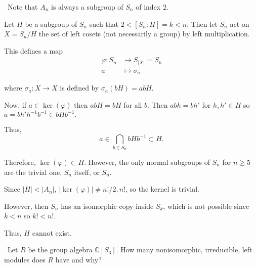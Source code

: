 \documentclass[12pt]{AlgebraQual}
\begin{document}
\begin{solution}$\,$
Note that $A_n$ is always a subgroup of $S_n$ of index $2.$

Let $H$ be a subgroup of $S_n$ such that $2<[S_n:H]=k<n$. Then let $S_n$ act on $X=S_n/H$ the set of left cosets (not necessarily a group) by left multiplication.

This defines a map \begin{align*}
    \varphi:S_n&\to S_{|X|}=S_k\\
    a&\mapsto \sigma_a
\end{align*}

where $\sigma_a:X\to X$ is defined by $\sigma_a(bH)=abH$.

Now, if $a\in\ker(\varphi)$ then $abH=bH$ for all $b$. Then $abh=bh'$ for $h,h'\in H$ so $a=bh'h^{-1}b^{-1}\in bHb^{-1}.$

Thus, $$a\in \bigcap_{b\in S_n}bHb^{-1}\subset H.$$

Therefore, $\ker(\varphi)\subset H$. However, the only normal subgroups of $S_n$ for $n\ge 5$ are the trivial one, $S_n$ itself, or $S_n.$

Since $|H|<|A_n|$, $|\ker(\varphi)|\not=n!/2,n!$, so the kernel is trivial.

However, then $S_n$ has an isomorphic copy inside $S_k$, which is not possible since $k<n$ so $k!<n!.$

Thus, $H$ cannot exist.
\end{solution}
\newpage




\begin{problem} $\,$
Let $R$ be the group algebra $\mathbb{C}[S_3]$. How many nonisomorphic, irreducible, left modules does $R$ have and why?
\end{problem}
\end{document}
